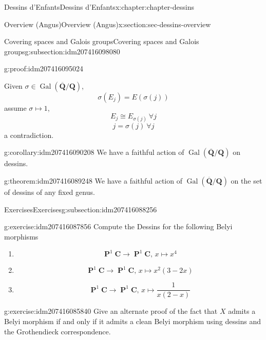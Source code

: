 \documentclass[oneside,10pt,]{book}
\numberwithin{equation}{section}
\newcommand{\QQ}{\mathbf{Q}}
\newcommand{\CC}{\mathbf{C}}
\newcommand{\absgal}[1]{\operatorname{Gal}(\overline{#1}/#1)}
\DeclareMathOperator{\PP}{\mathbf{P}}
\begin{document}
\begin{chapterptx}{Dessins d'Enfants}{}{Dessins d'Enfants}{}{}{x:chapter:chapter-dessins}
\begin{sectionptx}{Overview (Angus)}{}{Overview (Angus)}{}{}{x:section:sec-dessins-overview}
\begin{subsectionptx}{Covering spaces and Galois groups}{}{Covering spaces and Galois groups}{}{}{g:subsection:idm207416098080}
\begin{proofptx}{}{g:proof:idm207416095024}
\par
Given \(\sigma \in \absgal{\QQ}\),%
\begin{equation*}
\sigma(E_j) = E(\sigma(j))
\end{equation*}
assume \(\sigma \mapsto 1\),%
\begin{equation*}
E_j \cong E_{\sigma(j)}\ \forall j
\end{equation*}
%
\begin{equation*}
j = \sigma(j) \ \forall j
\end{equation*}
a contradiction.%
\end{proofptx}
\begin{corollary}{}{}{g:corollary:idm207416090208}%
We have a faithful action of \(\absgal{\QQ}\) on dessins.%
\end{corollary}
\begin{theorem}{}{}{g:theorem:idm207416089248}%
We have a faithful action of \(\absgal{\QQ}\) on the set of dessins of any fixed genus.%
\end{theorem}
\end{subsectionptx}
%
%
\typeout{************************************************}
\typeout{************************************************}
%
\begin{subsectionptx}{Exercises}{}{Exercises}{}{}{g:subsection:idm207416088256}
\begin{inlineexercise}{}{g:exercise:idm207416087856}%
Compute the Dessins for the following Belyi morphisms%
\begin{enumerate}
\item{}%
\begin{equation*}
\PP^1\CC\to \PP^1\CC,\,x\mapsto x^4
\end{equation*}
%
\item{}%
\begin{equation*}
\PP^1\CC\to \PP^1\CC,\,x\mapsto x^2(3-2x)
\end{equation*}
%
\item{}%
\begin{equation*}
\PP^1\CC\to \PP^1\CC,\,x\mapsto \frac{1}{x(2-x)}
\end{equation*}
%
\end{enumerate}
%
\end{inlineexercise}
\begin{inlineexercise}{}{g:exercise:idm207416085840}%
Give an alternate proof of the fact that \(X\) admits a Belyi morphism if and only if it admits a clean Belyi morphism using dessins and the Grothendieck correspondence.%

\end{inlineexercise}
\end{subsectionptx}
\end{sectionptx}
\end{chapterptx}
\end{document}
